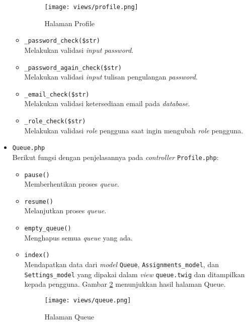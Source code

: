 \begin{itemize}
\begin{itemize}
		            \begin{figure}[H]
			            \centering
			            \texttt{[image: views/profile.png]}
			            \caption{Halaman Profile}
			            \label{fig:3:1:1:profile}
		            \end{figure}
		      \item \verb|_password_check($str)| \\
		            Melakukan validasi \textit{input password}.
		      \item \verb|_password_again_check($str)| \\
		            Melakukan validasi \textit{input} tulisan pengulangan \textit{password}.
		      \item \verb|_email_check($str)| \\
		            Melakukan validasi ketersediaan email pada \textit{database}.
		      \item \verb|_role_check($str)| \\
		            Melakukan validasi \textit{role} pengguna saat ingin mengubah \textit{role} pengguna.

	      \end{itemize}

	\item \verb|Queue.php| \\
	      Berikut fungsi dengan penjelasannya pada \textit{controller} \verb|Profile.php|:

	      \begin{itemize}
		      \item \verb|pause()| \\
		            Memberhentikan proses \textit{queue}.
		      \item \verb|resume()| \\
		            Melanjutkan proses \textit{queue}.
		      \item \verb|empty_queue()| \\
		            Menghapus semua \textit{queue} yang ada.
		      \item \verb|index()| \\
		            Mendapatkan data dari \textit{model} \verb|Queue|, \verb|Assignments_model|, dan \verb|Settings_model| yang dipakai dalam \textit{view} \verb|queue.twig| dan ditampilkan kepada pengguna. Gambar \ref{fig:3:1:1:queue} menunjukkan hasil halaman Queue.

		            \begin{figure}
			            \centering
			            \texttt{[image: views/queue.png]}
			            \caption{Halaman Queue}
			            \label{fig:3:1:1:queue}
		            \end{figure}


\end{itemize}
\end{itemize}

